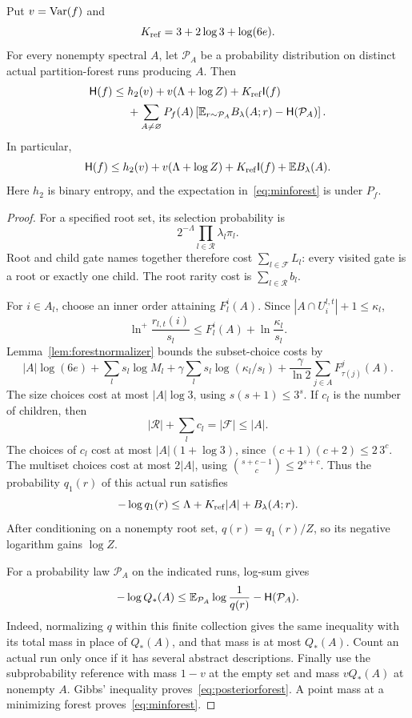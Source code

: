 \begin{theorem}\label{thm:posteriorforest}
Put $v=\operatorname{Var}(f)$ and
\[
 K_{\rm ref}=3+2\log3+\log(6e).
\]
For every nonempty spectral $A$, let $\mathcal P_A$ be a probability distribution on distinct actual partition-forest runs producing $A$. Then
\begin{align}
 \mathsf H(f)\le{}&h_2(v)+v(\Lambda+\log Z)+K_{\rm ref}\mathsf I(f)\notag\\
 &+\sum_{A\ne\varnothing}P_f(A)
 \left[\mathbb E_{r\sim\mathcal P_A}B_\lambda(A;r)
       -\mathsf H(\mathcal P_A)\right].\label{eq:posteriorforest}
\end{align}
In particular,
\begin{equation}\label{eq:minforest}
 \mathsf H(f)\le h_2(v)+v(\Lambda+\log Z)
             +K_{\rm ref}\mathsf I(f)+\mathbb E B_\lambda(A).
\end{equation}
Here $h_2$ is binary entropy, and the expectation in~\eqref{eq:minforest} is under $P_f$.
\end{theorem}
\begin{proof}
For a specified root set, its selection probability is
\[
 2^{-\Lambda}\prod_{l\in\mathcal R}\lambda_l\pi_l.
\]
Root and child gate names together therefore cost $\sum_{l\in\mathcal F}L_l$: every visited gate is a root or exactly one child. The root rarity cost is $\sum_{l\in\mathcal R}b_l$.

For $i\in A_l$, choose an inner order attaining $F_l^i(A)$. Since $|A\cap U_i^{l,t}|+1\le\kappa_l$,
\[
 \ln^+\frac{r_{l,t}(i)}{s_l}
 \le F_l^i(A)+\ln\frac{\kappa_l}{s_l}.
\]
Lemma~\ref{lem:forestnormalizer} bounds the subset-choice costs by
\[
 |A|\log(6e)+\sum_l s_l\log M_l
 +\gamma\sum_l s_l\log(\kappa_l/s_l)
 +\frac{\gamma}{\ln2}\sum_{j\in A}F_{\tau(j)}^j(A).
\]
The size choices cost at most $|A|\log3$, using $s(s+1)\le3^s$. If $c_l$ is the number of children, then
\[
 |\mathcal R|+\sum_lc_l=|\mathcal F|\le|A|.
\]
The choices of $c_l$ cost at most $|A|(1+\log3)$, since $(c+1)(c+2)\le2\,3^c$. The multiset choices cost at most $2|A|$, using $\binom{s+c-1}{c}\le2^{s+c}$. Thus the probability $q_1(r)$ of this actual run satisfies
\[
 -\log q_1(r)\le\Lambda+K_{\rm ref}|A|+B_\lambda(A;r).
\]
After conditioning on a nonempty root set, $q(r)=q_1(r)/Z$, so its negative logarithm gains $\log Z$.

For a probability law $\mathcal P_A$ on the indicated runs, log-sum gives
\[
 -\log Q_*(A)\le
 \mathbb E_{\mathcal P_A}\log\frac1{q(r)}-\mathsf H(\mathcal P_A).
\]
Indeed, normalizing $q$ within this finite collection gives the same inequality with its total mass in place of $Q_*(A)$, and that mass is at most $Q_*(A)$. Count an actual run only once if it has several abstract descriptions. Finally use the subprobability reference with mass $1-v$ at the empty set and mass $vQ_*(A)$ at nonempty $A$. Gibbs' inequality proves~\eqref{eq:posteriorforest}. A point mass at a minimizing forest proves~\eqref{eq:minforest}.
\end{proof}

